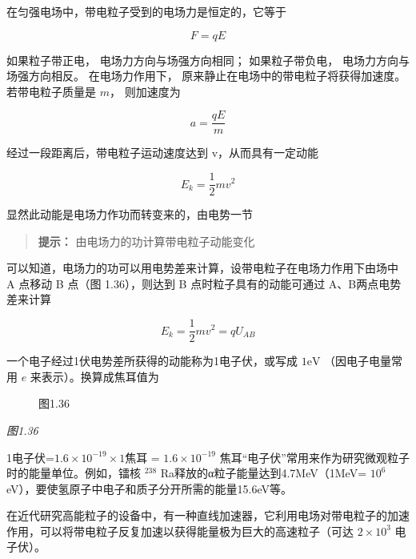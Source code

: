 在匀强电场中，带电粒子受到的电场力是恒定的，它等于

\[
F = q E
\]

如果粒子带正电， 电场力方向与场强方向相同； 如果粒子带负电，
电场力方向与场强方向相反。 在电场力作用下，
原来静止在电场中的带电粒子将获得加速度。 若带电粒子质量是 \(m\)，
则加速度为

\[
a = \frac{q E}{m} \tag{1.12}
\]

经过一段距离后，带电粒子运动速度达到 v，从而具有一定动能

\[
E_{k} = \frac{1}{2} m v^{2} \tag{1.13}
\]

显然此动能是电场力作功而转变来的，由电势一节

\begin{quote}
\textbf{提示：} 由电场力的功计算带电粒子动能变化
\end{quote}

可以知道，电场力的功可以用电势差来计算，设带电粒子在电场力作用下由场中 A
点移动 B 点（图 1.36），则达到 B 点时粒子具有的动能可通过
A、B两点电势差来计算

\[
E_{k} = \frac{1}{2} m v^{2} = q U_{A B} \tag{1.14}
\]

一个电子经过1伏电势差所获得的动能称为1电子伏，或写成 \(1\mathrm{eV}\)
（因电子电量常用 \(e\) 来表示）。换算成焦耳值为

\begin{figure}
\centering
{}
\caption{图1.36}
\end{figure}

\emph{图1.36}

1电子伏=\(1.6\times10^{-19}\times1\)焦耳 = \(1.6 \times 10^{-19}\)
焦耳``电子伏''常用来作为研究微观粒子时的能量单位。例如，镭核 \(^{238}\)
Ra释放的α粒子能量达到4.7MeV（1MeV= \(10^{6}\)
eV），要使氢原子中电子和质子分开所需的能量15.6eV等。

在近代研究高能粒子的设备中，有一种直线加速器，它利用电场对带电粒子的加速作用，可以将带电粒子反复加速以获得能量极为巨大的高速粒子（可达
\(2\times10^{3}\) 电子伏）。

